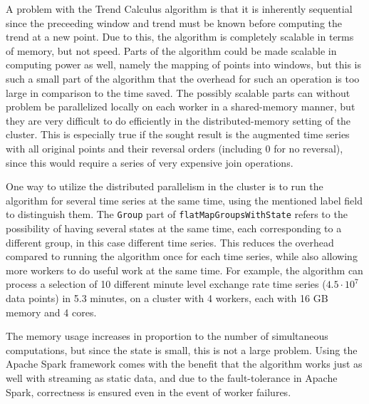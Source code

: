 \documentclass[../trend-calculus.tex]{subfiles}
\begin{document}
  A problem with the Trend Calculus algorithm is that it is inherently sequential since 
  the preceeding window and trend must be known before computing the trend at a new point.
  Due to this, the algorithm is completely scalable in terms of memory, but not speed.
  Parts of the algorithm could be made scalable in computing power as well, 
  namely the mapping of points into windows, but 
  this is such a small part of the algorithm that 
  the overhead for such an operation is too large in comparison to the time saved.
  The possibly scalable parts can without problem be 
  parallelized locally on each worker in a shared-memory manner, 
  but they are very difficult to do efficiently in 
  the distributed-memory setting of the cluster.
  This is especially true if the sought result is 
  the augmented time series with all original points and 
  their reversal orders (including 0 for no reversal), 
  since this would require a series of very expensive join operations.

  One way to utilize the distributed parallelism in the cluster is to 
  run the algorithm for several time series at the same time, 
  using the mentioned label field to distinguish them.
  The \verb|Group| part of \verb|flatMapGroupsWithState| refers to 
  the possibility of having several states at the same time, 
  each corresponding to a different group, in this case different time series.
  This reduces the overhead compared to running the algorithm once for each time series, 
  while also allowing more workers to do useful work at the same time.
  For example, the algorithm can process 
  a selection of 10 different minute level exchange rate time series \cite{histdata} 
  ($4.5 \cdot 10^7$ data points) in 5.3 minutes, on a cluster with 4 workers,
  each with 16 GB memory and 4 cores.

  The memory usage increases in proportion to the number of simultaneous computations, 
  but since the state is small, this is not a large problem.
  Using the Apache Spark framework comes with the benefit that 
  the algorithm works just as well with streaming as static data, and
  due to the fault-tolerance in Apache Spark,
  correctness is ensured even in the event of worker failures.
\end{document}

